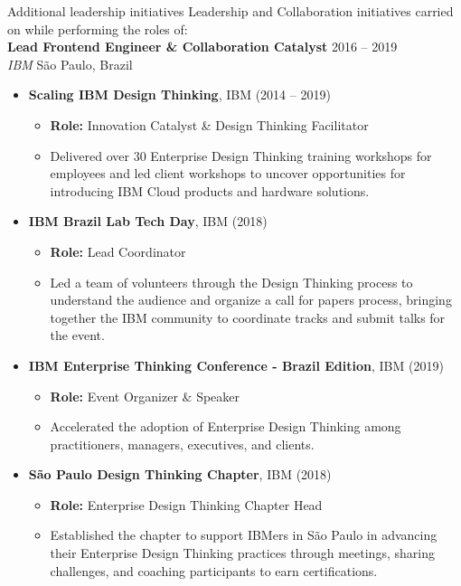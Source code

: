 \documentclass{resume} %
\begin{document}
\begin{rSection}{Additional leadership initiatives} 
Leadership and Collaboration initiatives carried on while performing the roles of:\\

\textbf {Lead Frontend Engineer \& Collaboration Catalyst} \hfill 2016 -- 2019\\
\textit{IBM} \hfill São Paulo, Brazil\\
\begin{itemize}
    \item \textbf{Scaling IBM Design Thinking}, \hfill IBM (2014 -- 2019) 
    \begin{itemize}
        \item \textbf{Role:} Innovation Catalyst \& Design Thinking Facilitator
        \item Delivered over 30 Enterprise Design Thinking training workshops for employees and led client workshops to uncover opportunities for introducing IBM Cloud products and hardware solutions.
    \end{itemize}
    
    \item \textbf{IBM Brazil Lab Tech Day}, \hfill IBM (2018) 
    \begin{itemize}
        \item \textbf{Role:} Lead Coordinator
        \item Led a team of volunteers through the Design Thinking process to understand the audience and organize a call for papers process, bringing together the IBM community to coordinate tracks and submit talks for the event.
    \end{itemize}
    
    \item \textbf{IBM Enterprise Thinking Conference - Brazil Edition}, \hfill IBM (2019) 
    \begin{itemize}
        \item \textbf{Role:} Event Organizer \& Speaker
        \item Accelerated the adoption of Enterprise Design Thinking among practitioners, managers, executives, and clients.
    \end{itemize}
    
    \item \textbf{São Paulo Design Thinking Chapter}, \hfill IBM (2018) 
    \begin{itemize}
        \item \textbf{Role:} Enterprise Design Thinking Chapter Head
        \item Established the chapter to support IBMers in São Paulo in advancing their Enterprise Design Thinking practices through meetings, sharing challenges, and coaching participants to earn certifications.
    \end{itemize}
    

\end{itemize}
\end{rSection}
\end{document}
